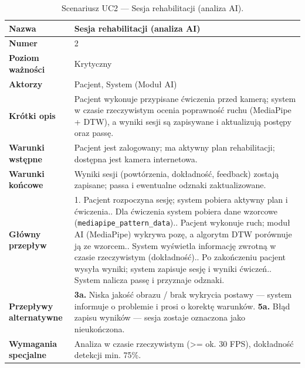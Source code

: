 \documentclass[11pt,a4paper]{article}
\begin{document}
\begin{table}[ht]
\small
\renewcommand{\arraystretch}{1.25}
\begin{tabularx}{\textwidth}{|>{\bfseries}p{}|Y|}
\hline
Nazwa & Sesja rehabilitacji (analiza AI) \\ \hline
Numer & 2 \\ \hline
Poziom ważności & Krytyczny \\ \hline
Aktorzy & Pacjent, System (Moduł AI) \\ \hline
Krótki opis & Pacjent wykonuje przypisane ćwiczenia przed kamerą; system w czasie rzeczywistym ocenia poprawność ruchu (MediaPipe + DTW), a wyniki sesji są zapisywane i aktualizują postępy oraz passę. \\ \hline
Warunki wstępne & Pacjent jest zalogowany; ma aktywny plan rehabilitacji; dostępna jest kamera internetowa. \\ \hline
Warunki końcowe & Wyniki sesji (powtórzenia, dokładność, feedback) zostają zapisane; passa i ewentualne odznaki zaktualizowane. \\ \hline
Główny przepływ & 1. Pacjent rozpoczyna sesję; system pobiera aktywny plan i ćwiczenia.. Dla ćwiczenia system pobiera dane wzorcowe (\texttt{mediapipe\_pattern\_data}).. Pacjent wykonuje ruch; moduł AI (MediaPipe) wykrywa pozę, a algorytm DTW porównuje ją ze wzorcem.. System wyświetla informację zwrotną w czasie rzeczywistym (dokładność).. Po zakończeniu pacjent wysyła wyniki; system zapisuje sesję i wyniki ćwiczeń.. System nalicza passę i przyznaje odznaki. \\ \hline
Przepływy alternatywne & \textbf{3a.} Niska jakość obrazu / brak wykrycia postawy — system informuje o problemie i prosi o korektę warunków.\newline
\textbf{5a.} Błąd zapisu wyników — sesja zostaje oznaczona jako nieukończona. \\ \hline
Wymagania specjalne & Analiza w czasie rzeczywistym (>= ok. 30 FPS), dokładność detekcji min. 75\%. \\ \hline
\end{tabularx}
\caption{Scenariusz UC2 — Sesja rehabilitacji (analiza AI).}
\end{table}
\FloatBarrier
\end{document}
